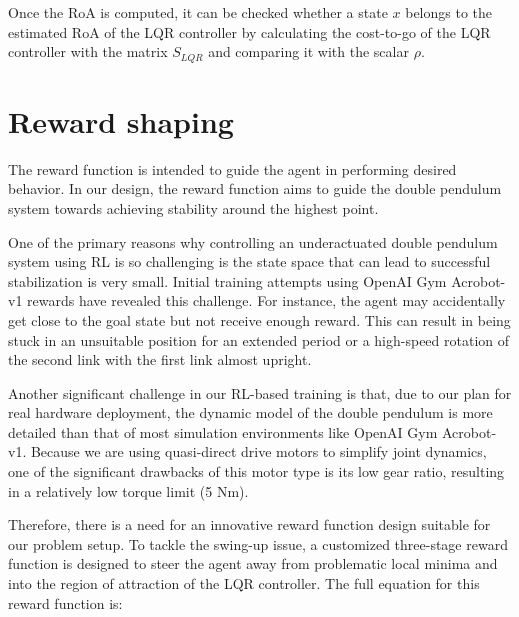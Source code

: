 Once the RoA is computed, it can be checked whether a state \(x\) belongs to the estimated RoA of the LQR controller by calculating the cost-to-go of the LQR controller with the matrix \(S_{LQR}\) and comparing it with the scalar \(\rho\).

\section{Reward shaping}
The reward function is intended to guide the agent in performing desired behavior. In our design, the reward function aims to guide the double pendulum system towards achieving stability around the highest point.

One of the primary reasons why controlling an underactuated double pendulum system using RL is so challenging is the state space that can lead to successful stabilization is very small. Initial training attempts using OpenAI Gym Acrobot-v1\cite{towers_gymnasium_2023} rewards have revealed this challenge. For instance, the agent may accidentally get close to the goal state but not receive enough reward. This can result in being stuck in an unsuitable position for an extended period or a high-speed rotation of the second link with the first link almost upright. 

Another significant challenge in our RL-based training is that, due to our plan for real hardware deployment, the dynamic model of the double pendulum is more detailed than that of most simulation environments like OpenAI Gym Acrobot-v1\cite{towers_gymnasium_2023}. Because we are using quasi-direct drive motors to simplify joint dynamics, one of the significant drawbacks of this motor type is its low gear ratio, resulting in a relatively low torque limit (5 Nm).

Therefore, there is a need for an innovative reward function design suitable for our problem setup. To tackle the swing-up issue, a customized three-stage reward function is designed to steer the agent away from problematic local minima and into the region of attraction of the LQR controller. The full equation for this reward function is:

